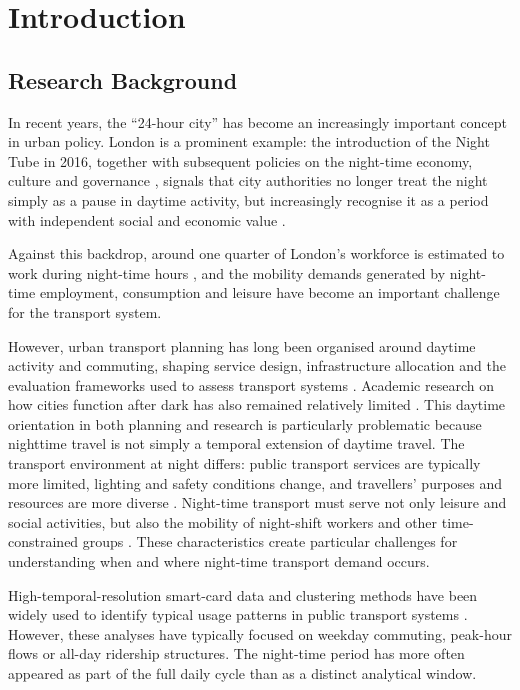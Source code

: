 \chapter{Introduction}
\label{chapterlabel1}

\section{Research Background}

In recent years, the ``24-hour city'' has become an increasingly important concept in urban policy. London is a prominent example: the introduction of the Night Tube in 2016, together with subsequent policies on the night-time economy, culture and governance \citep{TfL2016,GLAEconomics2024}, signals that city authorities no longer treat the night simply as a pause in daytime activity, but increasingly recognise it as a period with independent social and economic value \citep{Shaw2010,Shaw2014}.

Against this backdrop, around one quarter of London's workforce is estimated to work during night-time hours \citep{Mavrogeni2025}, and the mobility demands generated by night-time employment, consumption and leisure have become an important challenge for the transport system.

However, urban transport planning has long been organised around daytime activity and commuting, shaping service design, infrastructure allocation and the evaluation frameworks used to assess transport systems \citep{McArthur2019}. Academic research on how cities function after dark has also remained relatively limited \citep{VanLiempt2015}. This daytime orientation in both planning and research is particularly problematic because nighttime travel is not simply a temporal extension of daytime travel. The transport environment at night differs: public transport services are typically more limited, lighting and safety conditions change, and travellers' purposes and resources are more diverse \citep{Kapitza2022,Kapitza2025}. Night-time transport must serve not only leisure and social activities, but also the mobility of night-shift workers and other time-constrained groups \citep{Plyushteva2019,Shaw2022,Palm2023}. These characteristics create particular challenges for understanding when and where night-time transport demand occurs.

High-temporal-resolution smart-card data and clustering methods have been widely used to identify typical usage patterns in public transport systems \citep{Briand2016,ElMahrsi2017,Manley2018,Gan2020,Zhao2020}. However, these analyses have typically focused on weekday commuting, peak-hour flows or all-day ridership structures. The night-time period has more often appeared as part of the full daily cycle than as a distinct analytical window.

